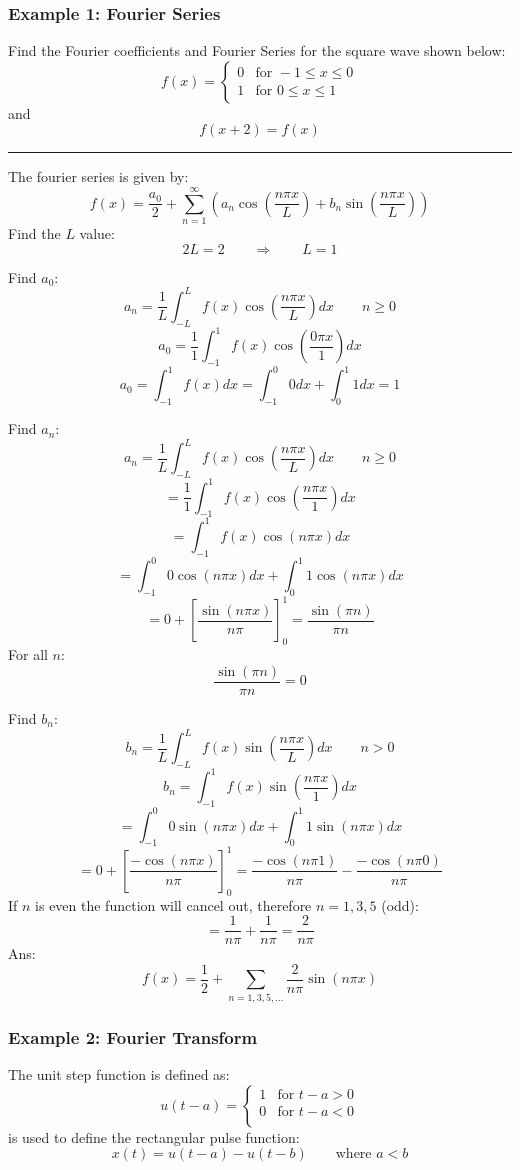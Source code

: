 \subsubsection{Example 1: Fourier Series}
Find the Fourier coefficients and Fourier Series for the square wave shown below:
$$f(x)=\begin{cases}
  0 &  \text{for }-1\leq x\leq0\\
  1 & \text{for }0\leq x\leq 1
\end{cases}$$
and
$$f(x+2)=f(x)$$


\noindent\rule{\textwidth}{1pt}

The fourier series is given by:
$$f(x)=\frac{a_{0}}{2}+\sum_{n=1}^{\infty}\left( a_{n}\cos\left( \frac{n\pi x}{L} \right)+b_{n}\sin\left( \frac{n\pi x}{L} \right) \right)$$
Find the $L$ value:
$$2L=2\qquad \Rightarrow \qquad L=1$$

Find $a_0$:
$$a_n  =\frac{1}{L} \int_{-L}^L f(x) \cos \left(\frac{n \pi x}{L}\right) d x\qquad   n \geq 0$$
$$a_0  =\frac{1}{1} \int_{-1}^1 f(x) \cos \left(\frac{0 \pi x}{1}\right) d x$$
$$a_0  =\int_{-1}^1 f(x) d x=\int_{-1}^0 0 d x+\int_{0}^1 1 d x=1$$

Find $a_n$:
$$a_n  =\frac{1}{L} \int_{-L}^L f(x) \cos \left(\frac{n \pi x}{L}\right) d x\qquad   n \geq 0$$
$$=\frac{1}{1} \int_{-1}^1 f(x) \cos \left(\frac{n \pi x}{1}\right) d x$$
$$=\int_{-1}^1 f(x) \cos \left(n \pi x\right) d x$$
$$=\int_{-1}^0 0 \cos \left(n \pi x\right) d x+\int_{0}^1 1 \cos \left(n \pi x\right) d x$$
$$=0+\left[\frac{\sin(n\pi x)}{n\pi}\right]^1_0=\frac{\sin (\pi  n)}{\pi  n}$$
For all $n$:
$$\frac{\sin (\pi  n)}{\pi  n}=0$$

Find $b_n$:
$$b_n  =\frac{1}{L} \int_{-L}^L f(x) \sin \left(\frac{n \pi x}{L}\right) d x\qquad   n>0$$
$$b_n  =\int_{-1}^1 f(x) \sin \left(\frac{n \pi x}{1}\right) d x$$
$$=\int_{-1}^0 0 \sin \left(n \pi x\right) d x+\int_{0}^1 1 \sin \left(n \pi x\right) d x$$
$$=0+\left[\frac{-\cos(n\pi x)}{n\pi}\right]^1_0=\frac{-\cos(n\pi 1)}{n\pi}-\frac{-\cos(n\pi 0)}{n\pi}$$
If $n$ is even the function will cancel out, therefore $n=1,3,5$ (odd):
$$=\frac{1}{n\pi}+\frac{1}{n\pi}=\frac{2}{n\pi}$$
Ans:
$$f(x)=\frac{1}{2}+\sum_{n=1,3,5,\dots}\frac{2}{n\pi}\sin(n\pi x)$$
\subsubsection{Example 2: Fourier Transform}
The unit step function is defined as:
$$u(t-a)=\begin{cases}
  1&  \text{for }t-a>0\\
  0&  \text{for }t-a<0\\
\end{cases}$$
is used to define the rectangular pulse function:
$$x(t)=u(t-a)-u(t-b)\qquad \text{where }a<b$$

